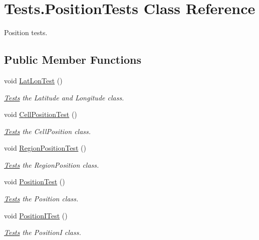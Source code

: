\hypertarget{classTests_1_1PositionTests}{}\section{Tests.\+Position\+Tests Class Reference}
\label{classTests_1_1PositionTests}


Position tests.  


\subsection*{Public Member Functions}
\begin{DoxyCompactItemize}
\item 
void \hyperlink{classTests_1_1PositionTests_a778bc026f7292e5b9936a35dc135c47b}{Lat\+Lon\+Test} ()
\begin{DoxyCompactList}\small\item\em \hyperlink{namespaceTests}{Tests} the Latitude and Longitude class. \end{DoxyCompactList}\item 
void \hyperlink{classTests_1_1PositionTests_acb9c6a4f99e612207c9d88dee2d083cd}{Cell\+Position\+Test} ()
\begin{DoxyCompactList}\small\item\em \hyperlink{namespaceTests}{Tests} the Cell\+Position class. \end{DoxyCompactList}\item 
void \hyperlink{classTests_1_1PositionTests_aef0ee198b84b4b140c7c50b485564178}{Region\+Position\+Test} ()
\begin{DoxyCompactList}\small\item\em \hyperlink{namespaceTests}{Tests} the Region\+Position class. \end{DoxyCompactList}\item 
void \hyperlink{classTests_1_1PositionTests_a9ee7be2c5a39540c4e0fb3b05f092acd}{Position\+Test} ()
\begin{DoxyCompactList}\small\item\em \hyperlink{namespaceTests}{Tests} the Position class. \end{DoxyCompactList}\item 
void \hyperlink{classTests_1_1PositionTests_a59d2892824e2aeb7d57b1d10fe2a63b7}{Position\+I\+Test} ()
\begin{DoxyCompactList}\small\item\em \hyperlink{namespaceTests}{Tests} the Position\+I class. \end{DoxyCompactList}\end{DoxyCompactItemize}


